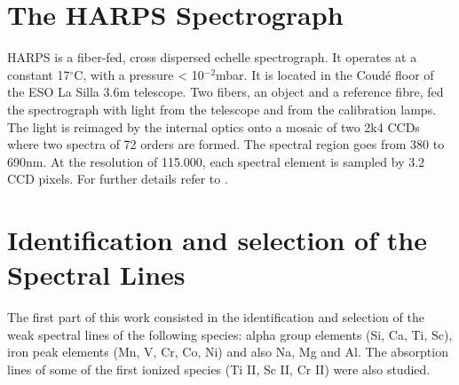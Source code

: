 \documentclass[dvips,12pt,a4paper]{report}
\begin{document}
{\section {The HARPS Spectrograph}


HARPS is a fiber-fed, cross dispersed echelle spectrograph. It operates at a constant 17$^\circ$C, with a pressure < 10$^{-2}$mbar. It is located in the Coud\'{e} floor of the ESO La Silla 3.6m telescope. Two fibers, an object and a reference fibre, fed the spectrograph with light from the telescope and from the calibration lamps. The light is reimaged by the internal optics onto a mosaic of two 2k4 CCDs where two spectra of 72 orders are formed. The spectral region goes from 380 to 690nm. At the resolution of 115.000, each spectral element is sampled by 3.2 CCD pixels. For further details refer to \citet{Mayor-2003b}. 



\section {Identification and selection of the Spectral Lines}

The first part of this work consisted in the identification and selection of the weak spectral lines of the following species: alpha group elements (Si, Ca, Ti, Sc), iron peak elements (Mn, V, Cr, Co, Ni) and also Na, Mg and Al. The absorption lines of some of the first ionized species (Ti II, Sc II, Cr II)  were also studied.

}
\end{document}
